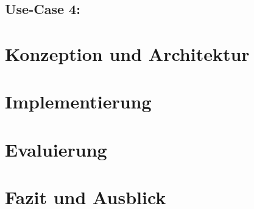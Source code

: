 \documentclass[a4paper,12pt]{scrreprt}
\begin{document}
\section*{\small \textbf{Use-Case 4:}}


\chapter{Konzeption und Architektur}

\chapter{Implementierung}

\chapter{Evaluierung}

\chapter{Fazit und Ausblick}

\printbibliography
\end{document}
